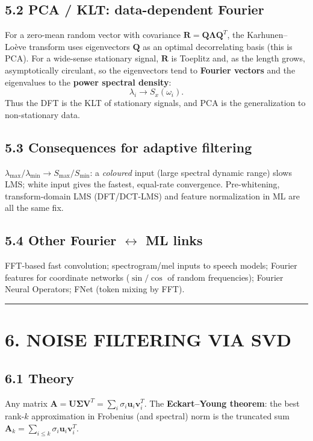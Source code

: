 \documentclass[11pt,a4paper]{article}
\begin{document}
\subsection{5.2 PCA / KLT: data-dependent Fourier}
For a zero-mean random vector with covariance $\mathbf{R}=\mathbf{Q}\boldsymbol{\Lambda}\mathbf{Q}^T$, the Karhunen--Lo\`eve transform uses eigenvectors $\mathbf{Q}$ as an optimal decorrelating basis (this is PCA). For a wide-sense stationary signal, $\mathbf{R}$ is Toeplitz and, as the length grows, asymptotically circulant, so the eigenvectors tend to \textbf{Fourier vectors} and the eigenvalues to the \textbf{power spectral density}:
\begin{equation}
\lambda_i \to S_x(\omega_i).
\end{equation}
Thus the DFT is the KLT of stationary signals, and PCA is the generalization to non-stationary data.

\subsection{5.3 Consequences for adaptive filtering}
$\lambda_{\max}/\lambda_{\min}\to S_{\max}/S_{\min}$: a \emph{coloured} input (large spectral dynamic range) slows LMS; white input gives the fastest, equal-rate convergence. Pre-whitening, transform-domain LMS (DFT/DCT-LMS) and feature normalization in ML are all the same fix.

\subsection{5.4 Other Fourier $\leftrightarrow$ ML links}
FFT-based fast convolution; spectrogram/mel inputs to speech models; Fourier features for coordinate networks ($\sin/\cos$ of random frequencies); Fourier Neural Operators; FNet (token mixing by FFT).

\noindent\rule{\textwidth}{0.5pt}

\section{6. NOISE FILTERING VIA SVD}

\subsection{6.1 Theory}
Any matrix $\mathbf{A}=\mathbf{U}\boldsymbol{\Sigma}\mathbf{V}^T=\sum_i\sigma_i\mathbf{u}_i\mathbf{v}_i^T$. The \textbf{Eckart--Young theorem}: the best rank-$k$ approximation in Frobenius (and spectral) norm is the truncated sum $\mathbf{A}_k=\sum_{i\le k}\sigma_i\mathbf{u}_i\mathbf{v}_i^T$.
\end{document}
